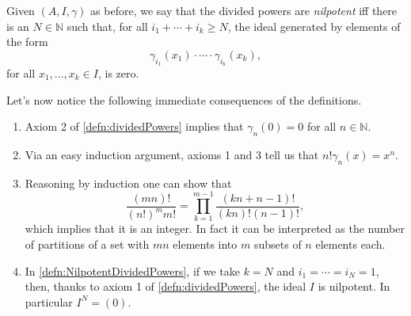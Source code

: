 \begin{defn}\label{defn:NilpotentDividedPowers}
	Given $\left(A, I, \gamma\right)$ as before, we say that the divided
	powers are \emph{nilpotent} iff there is an $N \in \mathbb{N}$ such that,
	for all $i_1 + \cdots + i_k \geq N$,
	the ideal generated by elements of the form
	\begin{equation*}
		\gamma_{i_1}(x_1) \cdot \cdots \cdot \gamma_{i_k}(x_k)
	,\end{equation*}
	for all $x_1, \ldots, x_k \in I$,
	is zero.
\end{defn}


\begin{rem}[]
	Let's now notice the following immediate consequences of the definitions.
\begin{enumerate}
\item Axiom 2 of \cref{defn:dividedPowers}
	implies that $\gamma_n(0) = 0$ for all $n \in \mathbb{N}$.

\item Via an easy induction argument, axioms 1 and 3 tell us that
	$n! \gamma_n(x) = x^n$.

\item Reasoning by induction one can show that
	\begin{equation*}
		\frac{\left( mn \right)!}{\left( n! \right)^m m!} =
		\prod_{k=1}^{m-1} \frac{\left( kn + n - 1 \right)!}{(kn)! (n-1)!}
	,\end{equation*}
	which implies that it is an integer.
	In fact it can be interpreted as the number of partitions of a set with $mn$
	elements into $m$ subsets of $n$ elements each.

\item In \cref{defn:NilpotentDividedPowers},
	if we take $k = N$ and $i_1 = \cdots = i_N = 1$,
	then, thanks to axiom 1 of \cref{defn:dividedPowers}, the ideal $I$
	is nilpotent.
	In particular $I^N = (0)$.
\end{enumerate}
\end{rem}


